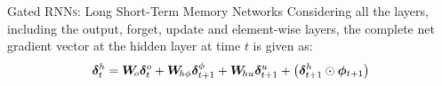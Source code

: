 \begin{frame}{Gated RNN\textsc{s}: Long Short-Term Memory Networks}
Considering all the layers,
including the output, forget, update and element-wise layers, 
the complete net gradient vector
at the hidden layer at time $t$ is given as:
\begin{align*}
    {\bm \delta}^h_t = {\boldsymbol W}_{\!o} {\bm \delta}^o_t + {\boldsymbol W}_{\!h\phi}
    {\bm \delta}^\phi_{t+1} + {\boldsymbol W}_{\!hu} {\bm \delta}^{u}_{t+1} + 
    \left({\bm \delta}^h_{t+1} \odot {\bm \phi}_{t+1}\right)
\end{align*}
\end{frame}
%
